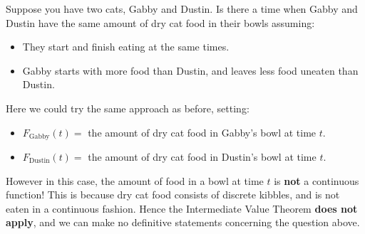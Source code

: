\documentclass{ximera}
\begin{document}
\begin{example}
Suppose you have two cats, Gabby and Dustin. Is there a time when Gabby
and Dustin have the same amount of dry cat food in their bowls assuming:
  \begin{itemize}
  \item They start and finish eating at the same times.
  \item Gabby starts with more food than Dustin, and leaves less food
    uneaten than Dustin.
  \end{itemize}

\begin{explanation} 
  Here we could try the same approach as before, setting:
  \begin{itemize}
    \item $F_{\mathrm{Gabby}}(t) =$ the amount of dry cat food in Gabby's bowl at time $t$.
    \item $F_{\mathrm{Dustin}}(t) =$ the amount of dry cat food in Dustin's bowl at time $t$.
  \end{itemize}
  However in this case, the amount of food in a bowl at time $t$ is
  \textbf{not} a continuous function! This is because dry cat food
  consists of discrete kibbles, and is not eaten in a continuous
  fashion. Hence the Intermediate Value Theorem \textbf{does not
    apply}, and we can make no definitive statements concerning the
  question above.
\end{explanation}
\end{example}
\end{document}

